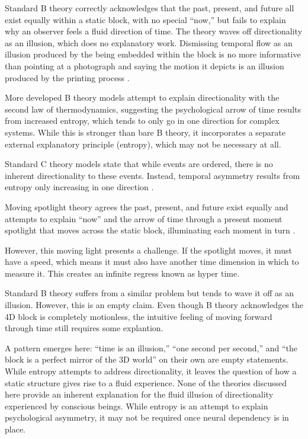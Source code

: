 \documentclass[11pt,a4paper]{article}
\begin{document}
Standard B theory correctly acknowledges that the past, present, and future all exist equally within a static block, with no special “now,” but fails to explain why an observer feels a fluid direction of time. The theory waves off directionality as an illusion, which does no explanatory work. Dismissing temporal flow as an illusion produced by the being embedded within the block is no more informative than pointing at a photograph and saying the motion it depicts is an illusion produced by the printing process \citep{mctaggart1908unreality}.

More developed B theory models attempt to explain directionality with the second law of thermodynamics, suggesting the psychological arrow of time results from increased entropy, which tends to only go in one direction for complex systems. While this is stronger than bare B theory, it incorporates a separate external explanatory principle (entropy), which may not be necessary at all. 

Standard C theory models state that while events are ordered, there is no inherent directionality to these events. Instead, temporal asymmetry results from entropy only increasing in one direction \citep{Dummett1960-DUMADO}.

Moving spotlight theory agrees the past, present, and future exist equally and attempts to explain ``now'' and the arrow of time through a present moment spotlight that moves across the static block, illuminating each moment in turn \citep{skow2009relativity}.

However, this moving light presents a challenge. If the spotlight moves, it must have a speed, which means it must also have another time dimension in which to measure it. This creates an infinite regress known as hyper time.

Standard B theory suffers from a similar problem but tends to wave it off as an illusion. However, this is an empty claim. Even though B theory acknowledges the 4D block is completely motionless, the intuitive feeling of moving forward through time still requires some explantion.

A pattern emerges here: ``time is an illusion,'' ``one second per second,'' and ``the block is a perfect mirror of the 3D world'' on their own are empty statements. While entropy attempts to address directionality, it leaves the question of how a static structure gives rise to a fluid experience. None of the theories discussed here provide an inherent explanation for the fluid illusion of directionality experienced by conscious beings. While entropy is an attempt to explain psychological asymmetry, it may not be required once neural dependency is in place.
\end{document}
